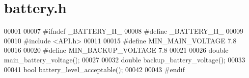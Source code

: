\section{battery.\+h}
\label{battery_8h_source}

\begin{DoxyCode}
00001 
00007 \textcolor{preprocessor}{#ifndef \_BATTERY\_H\_}
00008 \textcolor{preprocessor}{#define \_BATTERY\_H\_}
00009 
00010 \textcolor{preprocessor}{#include <API.h>}
00011 
00015 \textcolor{preprocessor}{#define MIN\_MAIN\_VOLTAGE 7.8}
00016 
00020 \textcolor{preprocessor}{#define MIN\_BACKUP\_VOLTAGE 7.8}
00021 
00026 \textcolor{keywordtype}{double} main_battery_voltage();
00027 
00032 \textcolor{keywordtype}{double} backup_battery_voltage();
00033 
00041 \textcolor{keywordtype}{bool} battery_level_acceptable();
00042 
00043 \textcolor{preprocessor}{#endif}
\end{DoxyCode}
